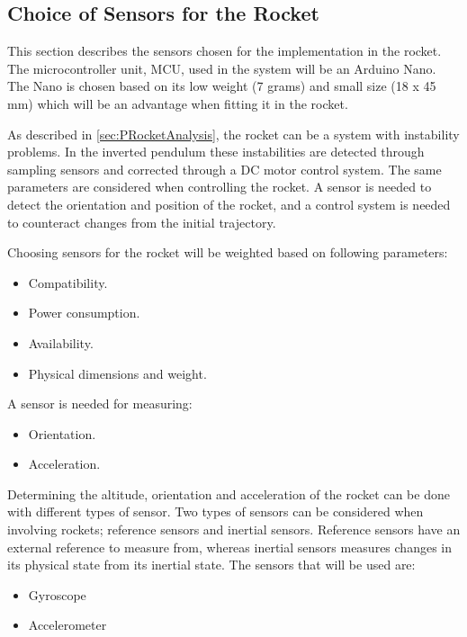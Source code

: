 \subsection{Choice of Sensors for the Rocket}  \label{sec:Rocket_sensor_choice}

This section describes the sensors chosen for the implementation in the rocket. The microcontroller unit, MCU, used in the system will be an Arduino Nano. The Nano is chosen based on its low weight (7 grams) and small size (18 x 45 mm) which will be an advantage when fitting it in the rocket.    

As described in \autoref{sec:PRocketAnalysis}, the rocket can be a system with instability problems. In the inverted pendulum these instabilities are detected through sampling sensors and corrected through a DC motor control system. The same parameters are considered when controlling the rocket. A sensor is needed to detect the orientation and position of the rocket, and a control system is needed to counteract changes from the initial trajectory.

Choosing sensors for the rocket will be weighted based on following parameters:

\begin{itemize}[noitemsep]
\item Compatibility.
\item Power consumption.
\item Availability. 
\item Physical dimensions and weight.
\end{itemize}

A sensor is needed for measuring:
\begin{itemize}[noitemsep]
\item Orientation.
\item Acceleration.
\end{itemize}

Determining the altitude, orientation and acceleration of the rocket can be done with different types of sensor. Two types of sensors can be considered when involving rockets; reference sensors and inertial sensors. Reference sensors have an external reference to measure from, whereas inertial sensors measures changes in its physical state from its inertial state. The sensors that will be used are:

\begin{itemize}[noitemsep]
\item Gyroscope
\item Accelerometer
\end{itemize}

